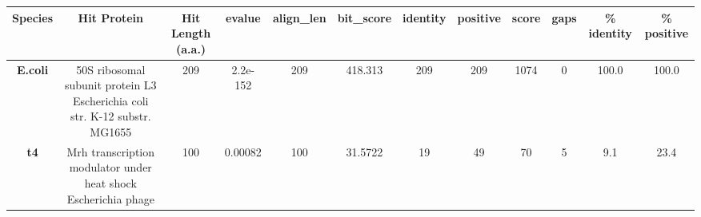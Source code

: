 \begin{tabular}{|c|c|c|c|c|c|c|c|c|c|c|c|} \hline
\textbf{Species} & \textbf{Hit Protein} & \textbf{Hit Length (a.a.)} & \textbf{evalue} & \textbf{align\_len} & \textbf{bit\_score} & \textbf{identity} & \textbf{positive} & \textbf{score} & \textbf{gaps} & \textbf{\% identity} & \textbf{\% positive} \\ \hline
\textbf{E.coli} & 50S ribosomal subunit protein L3 Escherichia coli str. K-12 substr. MG1655 & 209 & 2.2e-152 & 209 & 418.313 & 209 & 209 & 1074 & 0 & 100.0 & 100.0\\
\textbf{t4} & Mrh transcription modulator under heat shock Escherichia phage  & 100 & 0.00082 & 100 & 31.5722 & 19 & 49 & 70 & 5 & 9.1 & 23.4\\
\hline \end{tabular}
